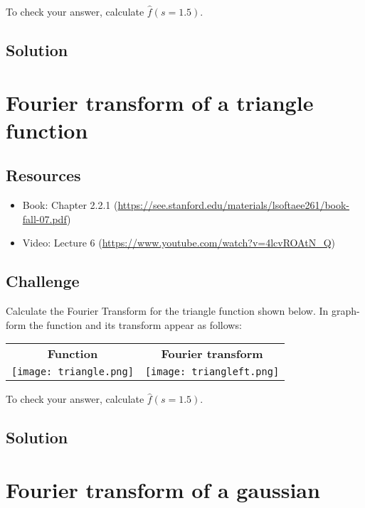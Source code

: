 To check your answer, calculate $\hat{f}(s=1.5)$.

\subsection*{Solution}




\newpage
\section{Fourier transform of a triangle function}
\label{sec:ft_triangle}

\subsection*{Resources}
\begin{itemize}
    \item Book: Chapter 2.2.1 (\url{https://see.stanford.edu/materials/lsoftaee261/book-fall-07.pdf})
    \item Video: Lecture 6 (\url{https://www.youtube.com/watch?v=4lcvROAtN_Q})
\end{itemize}

\subsection*{Challenge}
Calculate the Fourier Transform for the triangle function shown below. In graph-form the function and its transform appear as follows:

\begin{tabular}{cc}
    \textbf{Function} & \textbf{Fourier transform} \\
    \texttt{[image: triangle.png]} & \texttt{[image: triangleft.png]}
\end{tabular}

To check your answer, calculate $\hat{f}(s=1.5)$.

\subsection*{Solution}




\newpage
\section{Fourier transform of a gaussian}

